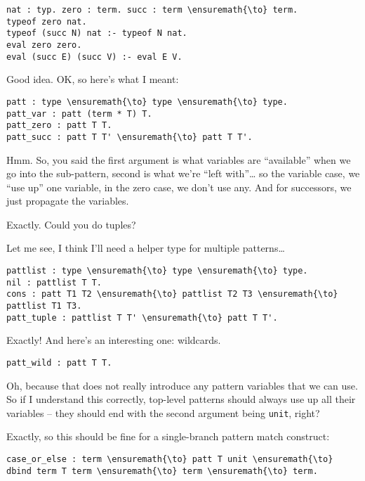 \begin{verbatim}
nat : typ. zero : term. succ : term \ensuremath{\to} term.
typeof zero nat.
typeof (succ N) nat :- typeof N nat.
eval zero zero.
eval (succ E) (succ V) :- eval E V.
\end{verbatim}

\heroADVISOR{} Good idea. OK, so here's what I meant:

\begin{verbatim}
patt : type \ensuremath{\to} type \ensuremath{\to} type.
patt_var : patt (term * T) T.
patt_zero : patt T T.
patt_succ : patt T T' \ensuremath{\to} patt T T'.
\end{verbatim}

\heroSTUDENT{} Hmm. So, you said the first argument is what variables are
``available'' when we go into the sub-pattern, second is what we're
``left with''\ldots{} so the variable case, we ``use up'' one variable,
in the zero case, we don't use any. And for successors, we just
propagate the variables.

\heroADVISOR{} Exactly. Could you do tuples?

\heroSTUDENT{} Let me see, I think I'll need a helper type for multiple
patterns\ldots{}

\begin{verbatim}
pattlist : type \ensuremath{\to} type \ensuremath{\to} type.
nil : pattlist T T.
cons : patt T1 T2 \ensuremath{\to} pattlist T2 T3 \ensuremath{\to} pattlist T1 T3.
patt_tuple : pattlist T T' \ensuremath{\to} patt T T'.
\end{verbatim}

\heroADVISOR{} Exactly! And here's an interesting one: wildcards.

\begin{verbatim}
patt_wild : patt T T.
\end{verbatim}

\heroSTUDENT{} Oh, because that does not really introduce any pattern
variables that we can use. So if I understand this correctly, top-level
patterns should always use up all their variables -- they should end
with the second argument being \texttt{unit}, right?

\heroADVISOR{} Exactly, so this should be fine for a single-branch pattern
match construct:

\begin{verbatim}
case_or_else : term \ensuremath{\to} patt T unit \ensuremath{\to} dbind term T term \ensuremath{\to} term \ensuremath{\to} term.
\end{verbatim}

